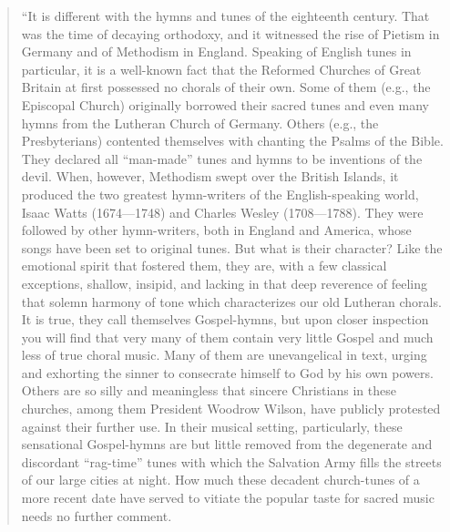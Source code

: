 \begin{quote}
“It is different with the hymns and tunes of the eighteenth century. That was the time of decaying orthodoxy, and it witnessed the rise of Pietism in Germany and of Methodism in England. Speaking of English tunes in particular, it is a well-known fact that the Reformed Churches of Great Britain at first possessed no chorals of their own. Some of them (e.g., the Episcopal Church) originally borrowed their sacred tunes and even many hymns from the Lutheran Church of Germany. Others (e.g., the Presbyterians) contented themselves with chanting the Psalms of the Bible. They declared all “man-made” tunes and hymns to be inventions of the devil. When, however, Methodism swept over the British Islands, it produced the two greatest hymn-writers of the English-speaking world, Isaac Watts (1674—1748) and Charles Wesley (1708—1788). They were followed by other hymn-writers, both in England and America, whose songs have been set to original tunes. But what is their character? Like the emotional spirit that fostered them, they are, with a few classical exceptions, shallow, insipid, and lacking in that deep reverence of feeling that solemn harmony of tone which characterizes our old Lutheran chorals. It is true, they call themselves Gospel-hymns, but upon closer inspection you will find that very many of them contain very little Gospel and much less of true choral music. Many of them are unevangelical in text, urging and exhorting the sinner to consecrate himself to God by his own powers. Others are so silly and meaningless that sincere Christians in these churches, among them President Woodrow Wilson, have publicly protested against their further use. In their musical setting, particularly, these sensational Gospel-hymns are but little removed from the degenerate and discordant “rag-time” tunes with which the Salvation Army fills the streets of our large cities at night. How much these decadent church-tunes of a more recent date have served to vitiate the popular taste for sacred music needs no further comment.

\end{quote}
